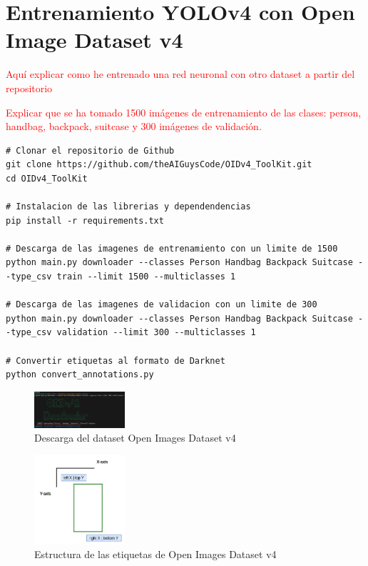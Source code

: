 \section{Entrenamiento YOLOv4 con Open Image Dataset v4}
\label{sec:train-openimagesv4}

\textcolor{red}{Aquí explicar como he entrenado una red neuronal con otro dataset a partir del repositorio \cite{OIDv4_ToolKit}}

\textcolor{red}{Explicar que se ha tomado 1500 imágenes de entrenamiento de las clases: person, handbag, backpack, suitcase y 300 imágenes de validación.}

\vspace{0.5cm}
\begin{lstlisting}[language=iPython,caption=Descarga dataset Open Images Dataset v4,captionpos=b,label={lst:download-oidv4}]
# Clonar el repositorio de Github
git clone https://github.com/theAIGuysCode/OIDv4_ToolKit.git
cd OIDv4_ToolKit

# Instalacion de las librerias y dependendencias
pip install -r requirements.txt

# Descarga de las imagenes de entrenamiento con un limite de 1500
python main.py downloader --classes Person Handbag Backpack Suitcase --type_csv train --limit 1500 --multiclasses 1

# Descarga de las imagenes de validacion con un limite de 300
python main.py downloader --classes Person Handbag Backpack Suitcase --type_csv validation --limit 300 --multiclasses 1

# Convertir etiquetas al formato de Darknet
python convert_annotations.py

\end{lstlisting}

\begin{figure}[ht]
\centering
\includegraphics[width=0.3\textwidth]{img/chapters/resultados/datasets/download-oidv4.png}
\caption{\label{fig:download-oidv4}Descarga del dataset Open Images Dataset v4}
\end{figure}

\begin{figure}[ht]
\centering
\includegraphics[width=0.3\textwidth]{img/chapters/resultados/datasets/bbox-oidv4.png}
\caption{\label{fig:bbox-oidv4}Estructura de las etiquetas de Open Images Dataset v4}
\end{figure}

